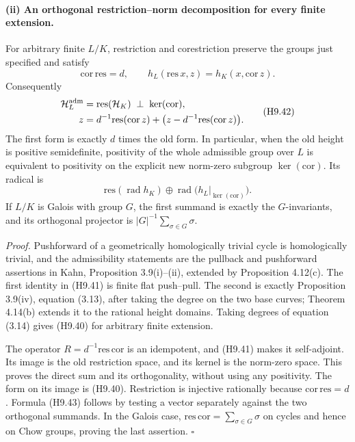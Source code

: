 \paragraph{(ii) An orthogonal restriction--norm decomposition for every finite extension.}
For arbitrary finite $L/K$, restriction and corestriction preserve the
groups just specified and satisfy
\[
 \mathrm{cor}\,\mathrm{res}=d,
 \qquad
 h_L(\mathrm{res}\,x,z)=h_K(x,\mathrm{cor}\,z).               \tag{H9.41}
\]
Consequently
\[
 \begin{split}
 \mathcal H_L^{\rm adm}
   &=\mathrm{res}(\mathcal H_K)\ \mathbin{\perp}\
                           \ker(\mathrm{cor}),\\
 z&=d^{-1}\mathrm{res}(\mathrm{cor}\,z)
       +\bigl(z-d^{-1}\mathrm{res}(\mathrm{cor}\,z)\bigr).
 \end{split}                                                \tag{H9.42}
\]
The first form is exactly $d$ times the old form. In particular, when
the old height is positive semidefinite, positivity of the whole
admissible group over $L$ is equivalent to positivity on the explicit
new norm-zero subgroup $\ker(\mathrm{cor})$. Its radical is
\[
 \mathrm{res}(\operatorname{rad}h_K)
       \oplus\operatorname{rad}
          \bigl(h_L|_{\ker(\mathrm{cor})}\bigr).              \tag{H9.43}
\]
If $L/K$ is Galois with group $G$, the first summand is exactly the
$G$-invariants, and its orthogonal projector is
$|G|^{-1}\sum_{\sigma\in G}\sigma$.

\emph{Proof.} Pushforward of a geometrically homologically trivial cycle
is homologically trivial, and the admissibility statements are the
pullback and pushforward assertions in Kahn, Proposition 3.9(i)--(ii),
extended by Proposition 4.12(c). The first identity in (H9.41) is
finite flat push--pull. The second is exactly Proposition 3.9(iv),
equation (3.13), after taking the degree on the two base curves;
Theorem 4.14(b) extends it to the rational height domains. Taking
degrees of equation (3.14) gives (H9.40) for arbitrary finite extension.

The operator $R=d^{-1}\mathrm{res}\,\mathrm{cor}$ is an idempotent,
and (H9.41) makes it self-adjoint. Its image is the old restriction
space, and its kernel is the norm-zero space. This proves the direct
sum and its orthogonality, without using any positivity. The form on
its image is (H9.40). Restriction is injective rationally because
$\mathrm{cor}\,\mathrm{res}=d$. Formula (H9.43) follows by testing a
vector separately against the two orthogonal summands. In the Galois
case, $\mathrm{res}\,\mathrm{cor}=\sum_{\sigma\in G}\sigma$ on
cycles and hence on Chow groups, proving the last assertion.
\hfill$\square$

